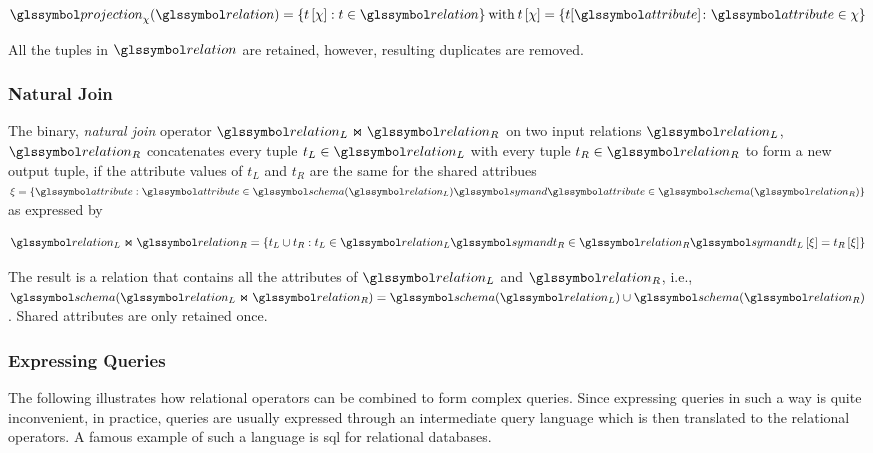 \begin{equation}
    \label{equation:rel_op_projection}
    \projection_{\chi}(\relation) = \{ t\left[ \chi \right] : t \in \relation \} \: \textrm{with} \: t\left[ \chi \right] = \{ t[\attribute] \colon \attribute \in \chi \}
\end{equation}

All the tuples in $\relation$ are retained, however, resulting duplicates are removed.

\subsubsection{Natural Join}

The binary, \emph{natural join} operator $\relation_L \Join \relation_R$ on two input relations $\relation_L$, $\relation_R$ concatenates every tuple $t_{L} \in \relation_L$ with every tuple $t_{R} \in \relation_R$ to form a new output tuple, if the attribute values of $t_{L}$ and $t_{R}$ are the same for the shared attribues $\xi = \{ \attribute : \attribute \in \schema(\relation_L) \symand \attribute \in \schema(\relation_R) \}$ as expressed by 

\begin{equation}
    \label{equation:rel_op_join}
    \relation_L \Join \relation_R = \{ t_L \cup t_R : t_L \in \relation_L \symand t_R \in \relation_R \symand t_L\left[ \xi \right] = t_R\left[ \xi \right] \}
\end{equation}

The result is a relation that contains all the attributes of $\relation_L$ and $\relation_R$, i.e., $\schema(\relation_L \Join \relation_R) = \schema(\relation_L) \cup \schema(\relation_R)$. Shared attributes are only retained once.

\subsubsection{Expressing Queries}

The following  illustrates how relational operators can be combined to form complex queries. Since expressing queries in such a way is quite inconvenient, in practice, queries are usually expressed through an intermediate query language which is then translated to the relational operators. A famous example of such a language is \acrshort{sql} \cite{Chamberlin:2012Early} for relational databases.

